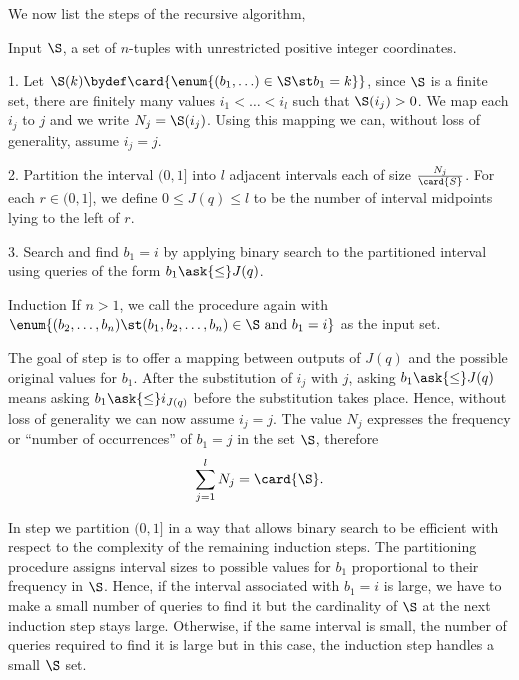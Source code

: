 We now list the steps of the recursive algorithm,
\begin{algorithm}

\item[Input] $\S$, a set of $n$-tuples with unrestricted positive integer
coordinates.

\item[1.] Let $\S(k) \bydef \card{\enum{(b_1, \ldots) \in \S \st b_1 = k}}$,
since $\S$ is a finite set, there are finitely many values $i_1 < \ldots < i_l$
such that $\S(i_j) > 0$. We map each $i_j$ to $j$
and we write $N_j = \S(i_j)$. Using this mapping we can, without loss of
generality, assume \(i_j = j\).

\item[2.] Partition the interval $(0,1]$ into $l$ adjacent intervals each of
size $\frac{N_j}{\card{S}}$. For each $r \in (0,1]$, we define $0 \le J(q) \le
l$ to be the number of interval midpoints lying to the left of $r$.

\item[3.] Search and find $b_1 = i$ by applying binary search to the partitioned
interval using queries of the form \(b_1 \ask{\le} J(q)\).

\item[Induction] If $n > 1$, we call the procedure again with\\
$\enum{(b_2, \ldots, b_n) \st (b_1, b_2, \ldots, b_n) \in \S \text{ and } b_1 =
i}$ as the input set.

\end{algorithm}

The goal of step  is to offer a mapping between outputs of $J(q)$ and
the possible original values for $b_1$. After the substitution of $i_j$ with
$j$, asking $b_1 \ask{\le} J(q)$ means asking $b_1 \ask{\le} i_{J(q)}$
before the substitution takes place. Hence, without loss of generality we can
now assume \(i_j = j\). The value $N_j$ expresses the frequency or ``number of
occurrences'' of $b_1 = j$ in the set $\S$, therefore
\begin{displaymath}
\sum\limits_{j=1}^{l} N_j = \card{\S}.
\end{displaymath}

In step  we partition $(0,1]$ in a way that allows binary search to
be efficient with respect to the complexity of the remaining induction steps.
The partitioning procedure assigns interval sizes to possible values for
$b_1$ proportional to their frequency in $\S$. Hence, if the interval
associated with $b_1 = i$ is large, we have to make a small number of
queries to find it but the cardinality of $\S$ at the next induction step
stays large. Otherwise, if the same interval is small, the number of queries
required to find it is large but in this case, the induction step
handles a small $\S$ set.


